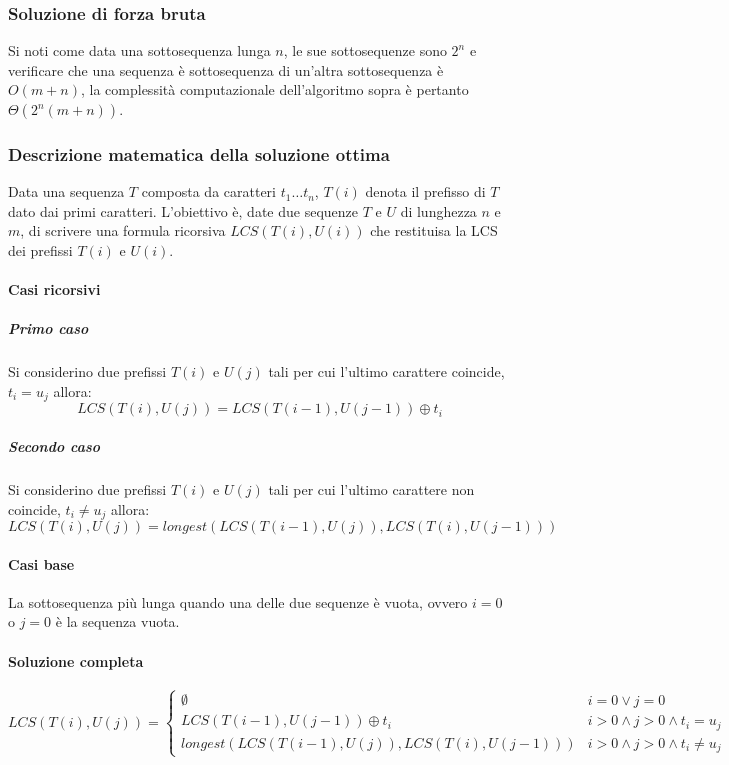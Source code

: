 		\subsubsection{Soluzione di forza bruta}
			
			Si noti come data una sottosequenza lunga $n$, le sue sottosequenze sono $2^n$ e verificare che una sequenza \`e sottosequenza di un'altra sottosequenza
			\`e $O(m+n)$, la complessit\`a computazionale dell'algoritmo sopra \`e pertanto $\Theta(2^n(m+n))$. 
		\subsubsection{Descrizione matematica della soluzione ottima}
			Data una sequenza $T$ composta da caratteri $t_1\dots t_n$, $T(i)$ denota il prefisso di $T$ dato dai primi caratteri. L'obiettivo \`e, date due sequenze
			$T$ e $U$ di lunghezza $n$ e $m$, di scrivere una formula ricorsiva $LCS(T(i), U(i))$ che restituisa la LCS dei prefissi $T(i)$ e $U(i)$. 
			\paragraph{Casi ricorsivi}
			\subparagraph{Primo caso}
			Si considerino due prefissi $T(i)$ e $U(j)$ tali per cui l'ultimo carattere coincide, $t_i = u_j$ allora: 
			$$LCS(T(i), U(j)) = LCS(T(i - 1), U(j - 1))\oplus t_i$$
			\subparagraph{Secondo caso}
			Si considerino due prefissi $T(i)$ e $U(j)$ tali per cui l'ultimo carattere non coincide, $t_i \neq u_j$ allora: 
			$$LCS(T(i), U(j)) = longest(LCS(T(i - 1), U(j)), LCS(T(i), U(j - 1)))$$
			\paragraph{Casi base}
			La sottosequenza pi\`u lunga quando una delle due sequenze \`e vuota, ovvero $i = 0$ o $j = 0$ \`e la sequenza vuota. 
			\paragraph{Soluzione completa}
			$$
			LCS(T(i), U(j)) = 
			\begin{cases}
			\emptyset & i = 0 \lor j = 0\\
			LCS(T(i - 1), U(j - 1))\oplus t_i & i > 0 \land j > 0 \land t_i = u_j\\
			longest(LCS(T(i - 1), U(j)), LCS(T(i), U(j - 1))) & i > 0 \land j > 0 \land t_i \neq u_j
			\end{cases}
			$$

